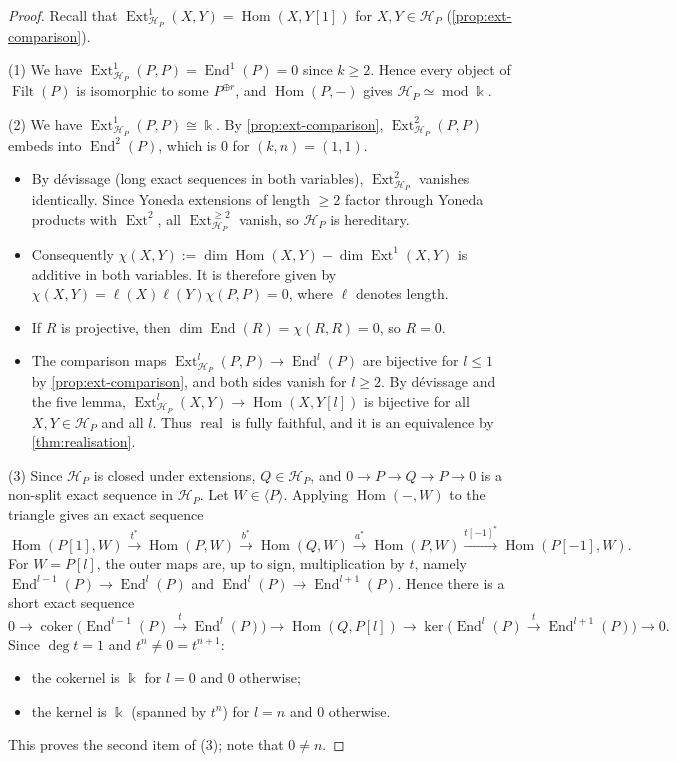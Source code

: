 \documentclass[11pt,reqno]{amsart}
\theoremstyle{plain}
\theoremstyle{definition}
\theoremstyle{remark}
\newcommand{\kk}{\Bbbk}
\DeclareMathOperator{\Hom}{Hom}
\DeclareMathOperator{\End}{End}
\DeclareMathOperator{\Ext}{Ext}
\DeclareMathOperator{\Filt}{Filt}
\DeclareMathOperator{\real}{real}
\newcommand{\modd}{\operatorname{mod}}
\newcommand{\thick}[1]{\langle #1\rangle}
\newcommand{\cH}{\mathcal{H}}
\begin{document}
\begin{proof}
Recall that $\Ext^1_{\cH_P}(X,Y)=\Hom(X,Y[1])$ for $X,Y\in\cH_P$ (\cref{prop:ext-comparison}).

(1) We have $\Ext^1_{\cH_P}(P,P)=\End^1(P)=0$ since $k\ge2$. Hence every object of $\Filt(P)$ is isomorphic to some $P^{\oplus r}$, and $\Hom(P,-)$ gives $\cH_P\simeq\modd\kk$.

(2) We have $\Ext^1_{\cH_P}(P,P)\cong\kk$. By \cref{prop:ext-comparison}, $\Ext^2_{\cH_P}(P,P)$ embeds into $\End^2(P)$, which is $0$ for $(k,n)=(1,1)$.
\begin{itemize}
\item By d\'evissage (long exact sequences in both variables), $\Ext^2_{\cH_P}$ vanishes identically. Since Yoneda extensions of length $\ge2$ factor through Yoneda products with $\Ext^2$, all $\Ext^{\ge2}_{\cH_P}$ vanish, so $\cH_P$ is hereditary.
\item Consequently $\chi(X,Y):=\dim\Hom(X,Y)-\dim\Ext^1(X,Y)$ is additive in both variables. It is therefore given by $\chi(X,Y)=\ell(X)\ell(Y)\chi(P,P)=0$, where $\ell$ denotes length.
\item If $R$ is projective, then $\dim\End(R)=\chi(R,R)=0$, so $R=0$.
\item The comparison maps $\Ext^l_{\cH_P}(P,P)\to\End^l(P)$ are bijective for $l\le1$ by \cref{prop:ext-comparison}, and both sides vanish for $l\ge2$. By d\'evissage and the five lemma, $\Ext^l_{\cH_P}(X,Y)\to\Hom(X,Y[l])$ is bijective for all $X,Y\in\cH_P$ and all $l$. Thus $\real$ is fully faithful, and it is an equivalence by \cref{thm:realisation}.
\end{itemize}

(3) Since $\cH_P$ is closed under extensions, $Q\in\cH_P$, and $0\to P\to Q\to P\to0$ is a non-split exact sequence in $\cH_P$. Let $W\in\thick P$. Applying $\Hom(-,W)$ to the triangle gives an exact sequence
\[\Hom(P[1],W)\xrightarrow{t^*}\Hom(P,W)\xrightarrow{b^*}\Hom(Q,W)\xrightarrow{a^*}\Hom(P,W)\xrightarrow{t[-1]^*}\Hom(P[-1],W).\]
For $W=P[l]$, the outer maps are, up to sign, multiplication by $t$, namely $\End^{l-1}(P)\to\End^l(P)$ and $\End^l(P)\to\End^{l+1}(P)$. Hence there is a short exact sequence
\[0\to\operatorname{coker}\big(\End^{l-1}(P)\xrightarrow{t}\End^l(P)\big)\to\Hom(Q,P[l])\to\ker\big(\End^l(P)\xrightarrow{t}\End^{l+1}(P)\big)\to0.\]
Since $\deg t=1$ and $t^n\ne0=t^{n+1}$:
\begin{itemize}
\item the cokernel is $\kk$ for $l=0$ and $0$ otherwise;
\item the kernel is $\kk$ (spanned by $t^n$) for $l=n$ and $0$ otherwise.
\end{itemize}
This proves the second item of (3); note that $0\neq n$.


\end{proof}
\end{document}
